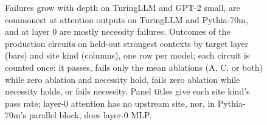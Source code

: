 
\begin{figure}[tbp]
\centering
\caption{Failures grow with depth on TuringLLM and GPT-2 small, are commonest at attention outputs on TuringLLM and Pythia-70m, and at layer 0 are mostly necessity failures.
Outcomes of the production circuits on held-out strongest contexts by target layer (bars) and site kind (columns), one row per model; each circuit is counted once: it passes, fails only the mean ablations (A, C, or both) while zero ablation and necessity hold, fails zero ablation while necessity holds, or fails necessity. Panel titles give each site kind's pass rate; layer-0 attention has no upstream site, nor, in Pythia-70m's parallel block, does layer-0 MLP.}
\label{fig:run2026-failure-anatomy}
\end{figure}
